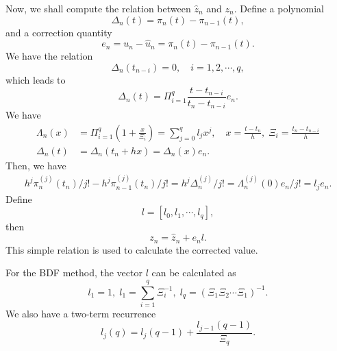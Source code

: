\documentclass[11pt,a4paper]{article}
\begin{document}
Now, we shall compute the relation between $\hat{z}_n$ and $z_n$. Define a
polynomial
\begin{equation}
  \Delta_n(t) = \pi_n(t) - \pi_{n-1}(t),
\end{equation}
and a correction quantity
\begin{equation}
  e_n = u_n - \hat{u}_n = \pi_n(t) - \pi_{n-1}(t).
\end{equation}
We have the relation
\begin{equation}
  \Delta_n(t_{n-i}) = 0, \quad i=1,2,\cdots,q,
\end{equation}
which leads to
\begin{equation}
  \Delta_n(t) = \Pi_{i=1}^q \frac{t-t_{n-i}}{t_n-t_{n-i}}e_n.
\end{equation}
We have
\begin{align}
  \Lambda_n(x) &= \Pi_{i=1}^q (1+\frac{x}{\Xi_i}) = \sum_{j=0}^{q}l_jx^{j}, \quad x=\frac{t-t_n}{h},\;
  \Xi_i = \frac{t_n-t_{n-i}}{h} \\
  \Delta_n(t) &= \Delta_n(t_n+hx) = \Delta_n(x)e_n.
\end{align}
Then, we have
\begin{align}
  h^j\pi_n^{(j)}(t_n)/j! - h^j\pi_{n-1}^{(j)}(t_n)/j! = h^j\Delta_n^{(j)}/j! =
  \Lambda_n^{(j)}(0)e_n/j! = l_je_n.
\end{align}
Define
\begin{equation}
  l = [l_0, l_1, \cdots, l_q],
\end{equation}
then
\begin{equation}
  z_n = \hat{z}_n + e_n l.
\end{equation}
This simple relation is used to calculate the corrected value.

For the BDF method, the vector $l$ can be calculated as
\begin{equation}
  l_1 = 1,\; l_1 = \sum_{i=1}^q \Xi_i^{-1},\; l_q =
  (\Xi_1\Xi_2\cdots\Xi_1)^{-1}.
\end{equation}
We also have a two-term recurrence
\begin{equation}
  l_j(q) = l_j(q-1) + \frac{l_{j-1}(q-1)}{\Xi_q}.
\end{equation}
\end{document}
